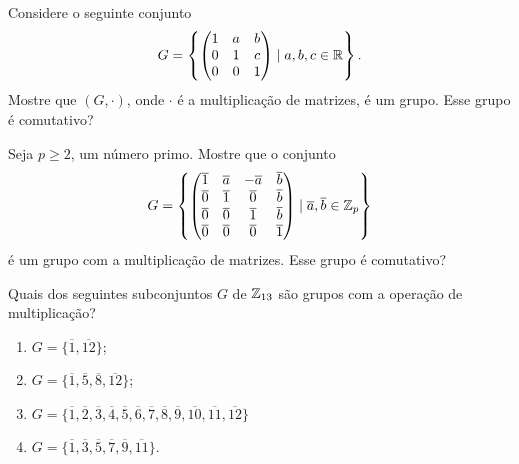 \documentclass[12pt]{exam}
\begin{document}
    \vspace{.3cm}

    \questao{} Considere o seguinte conjunto
    \[
        G = \left\{\begin{pmatrix} 1 & a & b\\ 0 & 1 & c \\ 0 & 0 & 1\end{pmatrix} \mid a, b, c \in \mathbb{R}\right\}.
    \]
    Mostre que $(G, \cdot)$, onde $\cdot$ é a multiplicação de matrizes, é um grupo. Esse grupo é comutativo?

    \vspace{.3cm}

    \questao{} Seja $p \ge 2$, um número primo. Mostre que o conjunto
    \[
        G = \left\{
                    \begin{pmatrix}
                        \overline{1} & \overline{a} & -\overline{a} & \overline{b}\\
                        \overline{0} & \overline{1} & \overline{0} & \overline{b}\\
                        \overline{0} & \overline{0} & \overline{1} & \overline{b}\\
                        \overline{0} & \overline{0} & \overline{0} & \overline{1}\\
                    \end{pmatrix}
                \mid \overline{a}, \overline{b} \in \mathbb{Z}_p
            \right\}
    \]
    é um grupo com a multiplicação de matrizes. Esse grupo é comutativo?
    \vspace{.3cm}

    \questao{} Quais dos seguintes subconjuntos $G$ de $\mathbb{Z}_{13}$ s{\~a}o grupos
    com a opera{\c c}{\~a}o de multiplica{\c c}{\~a}o?
    \begin{multicols}{2}
        \begin{enumerate}[label=({\alph*})]
            \item $G=\{\overline{1},\overline{12}\}$;

            \item $G=\{\overline{1},\overline{5},\overline{8},\overline{12}\}$;

            \item $G=\{\overline{1},\overline{2},\overline{3},\overline{4}, \overline{5},\overline{6},\overline{7}, \overline{8},\overline{9},\overline{10},\overline{11},\overline{12}\}$

            \item $G=\{\overline{1}, \overline{3},\overline{5},\overline{7},\overline{9},\overline{11}\}$.
        \end{enumerate}
    \end{multicols}
\end{document}
